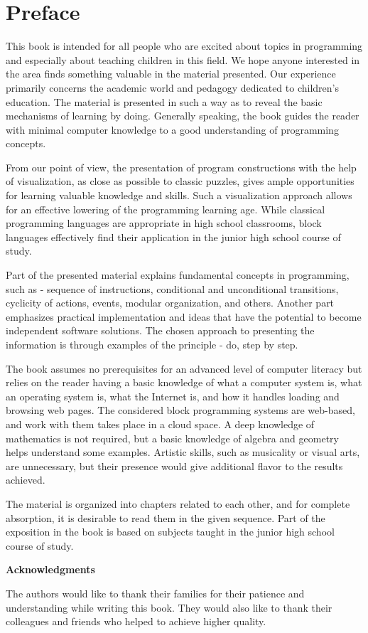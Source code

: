 ﻿
\chapter*{Preface}
\thispagestyle{empty}

This book is intended for all people who are excited about topics in programming and especially about teaching children in this field. We hope anyone interested in the area finds something valuable in the material presented. Our experience primarily concerns the academic world and pedagogy dedicated to children's education. The material is presented in such a way as to reveal the basic mechanisms of learning by doing. Generally speaking, the book guides the reader with minimal computer knowledge to a good understanding of programming concepts.

From our point of view, the presentation of program constructions with the help of visualization, as close as possible to classic puzzles, gives ample opportunities for learning valuable knowledge and skills. Such a visualization approach allows for an effective lowering of the programming learning age. While classical programming languages are appropriate in high school classrooms, block languages effectively find their application in the junior high school course of study.

Part of the presented material explains fundamental concepts in programming, such as - sequence of instructions, conditional and unconditional transitions, cyclicity of actions, events, modular organization, and others. Another part emphasizes practical implementation and ideas that have the potential to become independent software solutions. The chosen approach to presenting the information is through examples of the principle - do, step by step.

The book assumes no prerequisites for an advanced level of computer literacy but relies on the reader having a basic knowledge of what a computer system is, what an operating system is, what the Internet is, and how it handles loading and browsing web pages. The considered block programming systems are web-based, and work with them takes place in a cloud space. A deep knowledge of mathematics is not required, but a basic knowledge of algebra and geometry helps understand some examples. Artistic skills, such as musicality or visual arts, are unnecessary, but their presence would give additional flavor to the results achieved.

The material is organized into chapters related to each other, and for complete absorption, it is desirable to read them in the given sequence. Part of the exposition in the book is based on subjects taught in the junior high school course of study.

\vspace{0.5cm}

\large{\textbf{Acknowledgments}}

\vspace{0.5cm}

The authors would like to thank their families for their patience and understanding while writing this book. They would also like to thank their colleagues and friends who helped to achieve higher quality.

